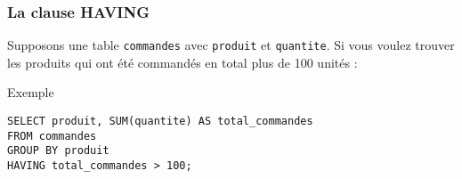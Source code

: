 \begin{frame}
  \frametitle{La clause HAVING}

  Supposons une table \texttt{commandes} avec \texttt{produit} et \texttt{quantite}. Si vous voulez trouver les produits qui ont été commandés en total plus de 100 unités :

  \begin{exampleblock}{Exemple}

    \texttt{SELECT produit, SUM(quantite) AS total\_commandes \\
    FROM commandes \\
    GROUP BY produit \\
    HAVING total\_commandes > 100;}
  \end{exampleblock}
\end{frame}
